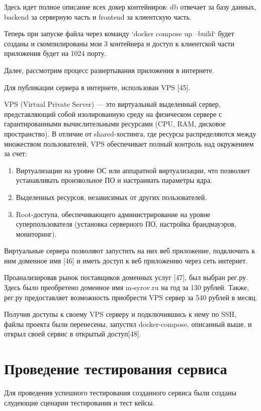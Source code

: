 \documentclass[a4paper,14pt,oneside]{extreport}
\begin{document}
Здесь идет полное описание всех докер контейниров: db отвечает за базу данных, backend за серверную часть и frontend за клиентскую часть.

Теперь при запуске файла через команду `docker compose up --build` будет созданы и скомпилированы мои 3 контейнера и доступ к клиентской части приложения будет на 1024 порту.


Далее, рассмотрим процесс развертывания приложения в интернете.

Для публикации сервера в интернете, использован VPS [45].

VPS (Virtual Private Server) — это виртуальный выделенный сервер, представляющий собой изолированную среду на физическом сервере с гарантированными вычислительными ресурсами (CPU, RAM, дисковое пространство). В отличие от shared-хостинга, где ресурсы распределяются между множеством пользователей, VPS обеспечивает полный контроль над окружением за счет:

\begin{enumerate}
    \item Виртуализации на уровне ОС или аппаратной виртуализации, что позволяет устанавливать произвольное ПО и настраивать параметры ядра.
   \item Выделенных ресурсов, независимых от других пользователей.
   \item Root-доступа, обеспечивающего администрирование на уровне суперпользователя (установка серверного ПО, настройка брандмауэров, мониторинг).
\end{enumerate}

Виртуальные сервера позволяют запустить на них веб приложение, подключить к ним доменное имя [46] и иметь доступ к веб приложению через сеть интернет.

Проанализировав рынок поставщиков доменных услуг [47], был выбран рег.ру. Здесь было преобретено доменное имя m-syrov.ru на год за 130 рублей. Также, рег.ру предоставляет возможность приобрести VPS сервер за 540 рублей в месяц.

Получив доступы к своему VPS серверу и подключившись к нему по SSH, файлы проекта были перенесены, запустил docker-compose, описанный выше, и открыл своей сервис в открытый доступ[48].

\section {Проведение тестирования сервиса}

Для проведения успешного тестирования созданного сервиса были созданы слудеющие сценарии тестирования и тест кейсы.
\end{document}
